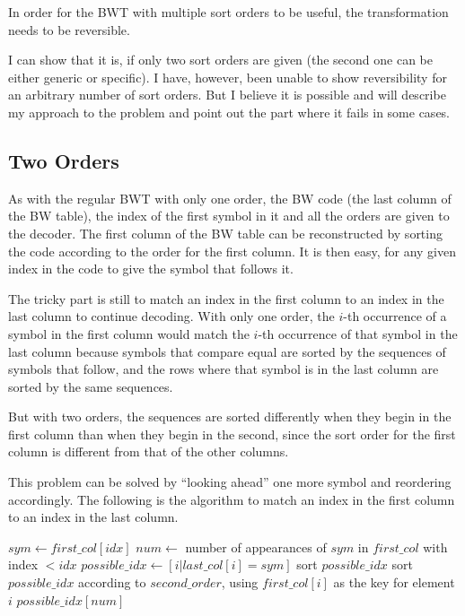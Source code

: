 \documentclass[a4paper]{scrreprt}
\begin{document}
In order for the BWT with multiple sort orders to be useful, the transformation
needs to be reversible.

I can show that it is, if only two sort orders are given (the second one can be
either generic or specific). I have, however, been unable to show reversibility
for an arbitrary number of sort orders. But I believe it is possible and will
describe my approach to the problem and point out the part where it fails in
some cases.

\subsection{Two Orders}

As with the regular BWT with only one order, the BW code (the last column of
the BW table), the index of the first symbol in it and all the orders are given
to the decoder. The first column of the BW table can be reconstructed by sorting
the code according to the order for the first column. It is then easy, for any
given index in the code to give the symbol that follows it.

The tricky part is still to match an index in the first column to an index in
the last column to continue decoding. With only one order, the \(i\)-th
occurrence of a symbol in the first column would match the \(i\)-th occurrence
of that symbol in the last column because symbols that compare equal are sorted
by the sequences of symbols that follow, and the rows where that symbol is in
the last column are sorted by the same sequences.

But with two orders, the sequences are sorted differently when they begin in the
first column than when they begin in the second, since the sort order for the
first column is different from that of the other columns.

This problem can be solved by ``looking ahead'' one more symbol and reordering
accordingly. The following is the algorithm to match an index in the first
column to an index in the last column.

\begin{algorithm}
\begin{algorithmic}[1]
\State $sym \gets first\_col[idx]$
\State $num \gets$ number of appearances of $sym$ in $first\_col$ with index $<
idx$
\State $possible\_idx \gets [i | last\_col[i] = sym]$
\State sort $possible\_idx$
\State sort $possible\_idx$ according to $second\_order$, using $first\_col[i]$
as the key for element $i$
\State \Return $possible\_idx[num]$
\EndProcedure
\end{algorithmic}
\end{algorithm}
\end{document}
